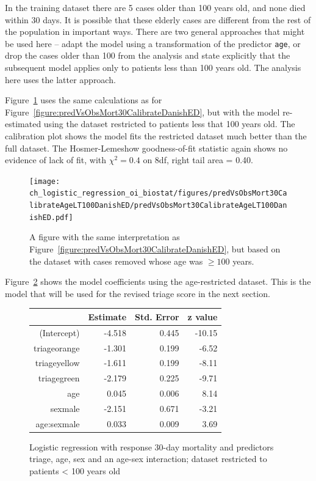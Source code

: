 In the training dataset there are 5 cases older than 100 years old, and none died within 30 days. It is possible that these elderly cases are different from the rest of the population in important ways. There are two general approaches that might be used here -- adapt the model using a transformation of the predictor \texttt{age}, or drop the cases older than 100 from the analysis and state explicitly that the subsequent model applies only to patients less than 100 years old.  The analysis here uses the latter approach.   

Figure~\ref{figure:predVsObsMort30CalibrateAgeLT100DanishED} uses the same calculations as for Figure~\ref{figure:predVsObsMort30CalibrateDanishED}, but with the model re-estimated using the dataset restricted to patients less that 100 years old. The calibration plot shows the model fits the restricted dataset much better than the full dataset.  The Hosmer-Lemeshow goodness-of-fit statistic again shows no evidence of lack of fit, with $\chi^2 = 0.4$ on 8df, right tail area = 0.40.

\begin{figure}[!tbh]
  \centering
  \texttt{[image: ch\_logistic\_regression\_oi\_biostat/figures/predVsObsMort30CalibrateAgeLT100DanishED/predVsObsMort30CalibrateAgeLT100DanishED.pdf]}
    \caption{A figure with the same interpretation as Figure~\ref{figure:predVsObsMort30CalibrateDanishED}, but based on the dataset with cases removed whose age was $\ge 100$ years.}
    \label{figure:predVsObsMort30CalibrateAgeLT100DanishED}
\end{figure}

Figure~\ref{figure:triageAgeSexMort30AgeRestrLogreg} shows the model coefficients using the age-restricted dataset.  This is the model that will be used for the revised triage score in the next section.

\begin{figure}[ht]
\centering
\begin{tabular}{rrrr}
  \hline
 & Estimate & Std. Error & z value  \\ 
  \hline
(Intercept) & -4.518 & 0.445 & -10.15 \\ 
  triageorange & -1.301 & 0.199 & -6.52  \\ 
  triageyellow & -1.611 & 0.199 & -8.11  \\ 
  triagegreen & -2.179 & 0.225 & -9.71  \\ 
  age & 0.045 & 0.006 & 8.14 \\ 
  sexmale & -2.151 & 0.671 & -3.21 \\ 
  age:sexmale & 0.033 & 0.009 & 3.69  \\ 
   \hline
\end{tabular}
\caption{Logistic regression with response 30-day mortality and 
       predictors triage, age, sex and an age-sex interaction; dataset restricted to patients < 100 years old} 
\label{figure:triageAgeSexMort30AgeRestrLogreg}
\end{figure}


